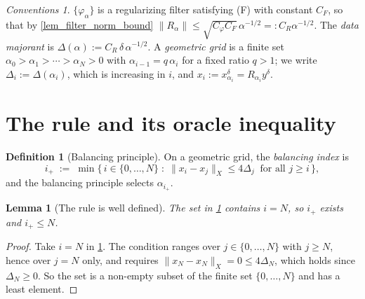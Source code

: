\documentclass[a4paper]{report}
\theoremstyle{plain}
\newtheorem{lemma}[theorem]{Lemma}
\theoremstyle{definition}
\newtheorem{definition}[theorem]{Definition}
\theoremstyle{remark}
\newtheorem{assumptions}[theorem]{Conventions}
\begin{document}
\begin{assumptions}
  \label{asm_balancing_principle}
  $\{\varphi_{\alpha}\}$ is a regularizing filter
satisfying (F) with constant $C_F$, so that by \cref{lem_filter_norm_bound}
$\|R_{\alpha}\| \le \sqrt{C_{\varphi}C_F}\,\alpha^{-1/2} =: C_R\alpha^{-1/2}$.  The
\emph{data majorant} is $\Delta(\alpha) := C_R\,\delta\,\alpha^{-1/2}$.  A \emph{geometric
grid} is a finite set $\alpha_0 > \alpha_1 > \cdots > \alpha_N > 0$ with
$\alpha_{i-1} = q\,\alpha_i$ for a fixed ratio $q > 1$; we write $\Delta_i :=
\Delta(\alpha_i)$, which is increasing in $i$, and $x_i := x^{\delta}_{\alpha_i} =
R_{\alpha_i}y^{\delta}$.
\end{assumptions}

\section{The rule and its oracle inequality}

\begin{definition}[Balancing principle]
  \label{def_balancing}
  On a geometric grid, the \emph{balancing index} is
  \[
    i_{+} \;:=\; \min\bigl\{\, i \in \{0,\dots,N\} \;:\;
      \|x_i - x_j\|_X \le 4\Delta_j \ \text{ for all } j \ge i \,\bigr\} ,
  \]
  and the balancing principle selects $\alpha_{i_{+}}$.
\end{definition}


\begin{lemma}[The rule is well defined]
  \label{lem_balancing_nonempty}
  The set in \cref{def_balancing} contains $i = N$, so $i_{+}$ exists and
  $i_{+} \le N$.
\end{lemma}
\begin{proof}
  Take $i = N$ in \cref{def_balancing}.  The condition ranges over $j \in \{0,\dots,N\}$
  with $j \ge N$, hence over $j = N$ only, and requires
  $\|x_N-x_N\|_X = 0 \le 4\Delta_N$, which holds since $\Delta_N \ge 0$.  So the set is a
  non-empty subset of the finite set $\{0,\dots,N\}$ and has a least element.
\end{proof}
\end{document}
